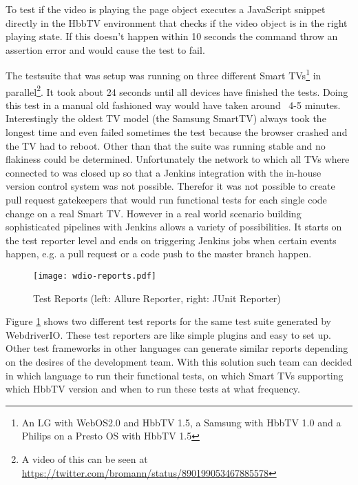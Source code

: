 To test if the video is playing the page object executes a JavaScript snippet directly in the HbbTV environment that checks if the video object is in the right playing state. If this doesn't happen within 10 seconds the command throw an assertion error and would cause the test to fail.

The testsuite that was setup was running on three different Smart TVs\footnote{An LG with WebOS2.0 and HbbTV 1.5, a Samsung with HbbTV 1.0 and a Philips on a Presto OS with HbbTV 1.5} in parallel\footnote{A video of this can be seen at \url{https://twitter.com/bromann/status/890199053467885578}}. It took about 24 seconds until all devices have finished the tests. Doing this test in a manual old fashioned way would have taken around ~4-5 minutes. Interestingly the oldest TV model (the Samsung SmartTV) always took the longest time and even failed sometimes the test because the browser crashed and the TV had to reboot. Other than that the suite was running stable and no flakiness could be determined. Unfortunately the network to which all TVs where connected to was closed up so that a Jenkins integration with the in-house version control system was not possible. Therefor it was not possible to create pull request gatekeepers that would run functional tests for each single code change on a real Smart TV. However in a real world scenario building sophisticated pipelines with Jenkins allows a variety of possibilities. It starts on the test reporter level and ends on triggering Jenkins jobs when certain events happen, e.g. a pull request or a code push to the master branch happen.

\begin{figure}[htb]
  \centering
  \hspace*{-0.5cm}
  \texttt{[image: wdio-reports.pdf]}\\
  \caption{Test Reports (left: Allure Reporter, right: JUnit Reporter)}\label{fig:wdioreports}
\end{figure}

Figure \ref{fig:wdioreports} shows two different test reports for the same test suite generated by WebdriverIO. These test reporters are like simple plugins and easy to set up. Other test frameworks in other languages can generate similar reports depending on the desires of the development team. With this solution such team can decided in which language to run their functional tests, on which Smart TVs supporting which HbbTV version and when to run these tests at what frequency.

